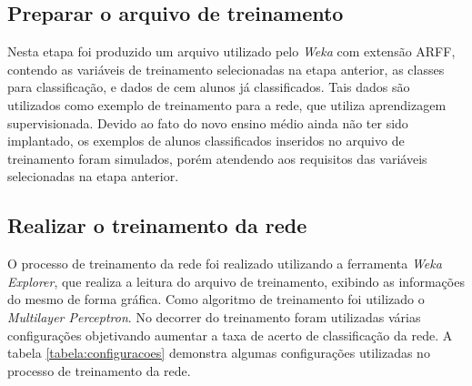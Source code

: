 \subsection{Preparar o arquivo de treinamento}

Nesta etapa foi produzido um arquivo utilizado pelo \textit{Weka} com extensão ARFF, contendo as variáveis de treinamento selecionadas na etapa anterior, as classes para classificação, e dados de cem alunos já classificados. Tais dados são utilizados como exemplo de treinamento para a rede, que utiliza aprendizagem supervisionada. Devido ao fato do novo ensino médio ainda não ter sido implantado, os exemplos de alunos classificados inseridos no arquivo de treinamento foram simulados, porém atendendo aos requisitos das variáveis selecionadas na etapa anterior.

\subsection{Realizar o treinamento da rede}

O processo de treinamento da rede foi realizado utilizando a ferramenta \textit{Weka Explorer}, que realiza a leitura do arquivo de treinamento, exibindo as informações do mesmo de forma gráfica. Como algoritmo de treinamento foi utilizado o \textit{Multilayer Perceptron}. No decorrer do treinamento foram utilizadas várias configurações objetivando aumentar a taxa de acerto de classificação da rede. A tabela \ref{tabela:configuracoes} demonstra algumas configurações utilizadas no processo de treinamento da rede.

